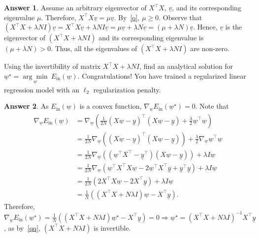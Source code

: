 \documentclass{article}
\theoremstyle{definition}
\newtheorem*{answer}{Answer}
\begin{document}
\begin{question}[start=0]
\begin{question}
			\begin{answer}
				Assume an arbitrary eigenvector of $X^\top X$, $\underline{v}$, and its corresponding eigenvalue $\mu$. Therefore, $X^\top X \underline{v} = \mu \underline{v}$. By~\ref{q}, $\mu \geq 0$. Observe that $(X^\top X + \lambda N  I) \underline{v} = X^\top X \underline{v} + \lambda N  I \underline{v} = \mu \underline{v} + \lambda N \underline{v} = (\mu + \lambda N) \underline{v}$. Hence, $\underline{v}$ is the eigenvector of $(X^\top X + \lambda N  I)$ and its corresponding eigenvalue is $(\mu + \lambda N) > 0$. Thus, all the eigenvalues of $(X^\top X + \lambda N  I)$ are non-zero.
			\end{answer}
			\item Using the invertibility of matrix $X^\top X + \lambda N  I$, find an analytical solution for $\underline{w}^\star = \underset{\underline{w}}{\arg \min}~E_{\text{in}}(\underline{w})$. Congratulations! You have trained a regularized linear regression model with an $\ell_2$ regularization penalty.
			\begin{answer}
				As $E_{\text{in}}(\underline{w})$ is a convex function, $\nabla_{\!\underline{w}}E_{\text{in}}(\underline{w}^\star) = 0$. Note that 
				\begin{align*}
					\nabla_{\!\underline{w}}E_{\text{in}}(\underline{w})  &= \nabla_{\!\underline{w}}(\frac{1}{2N} (X \underline{w} - \underline{y})^\top (X \underline{w} - \underline{y}) + \frac{\lambda}{2} \underline{w}^\top \underline{w})\\
					&= \frac{1}{2N} \nabla_{\!\underline{w}}\left((X \underline{w} - \underline{y})^\top (X \underline{w} - \underline{y})\right)+\frac{\lambda}{2} \nabla_{\!\underline{w}} \underline{w}^\top \underline{w}\\
					&= \frac{1}{2N} \nabla_{\!\underline{w}}\left((\underline{w}^\top X^\top  - \underline{y}^\top) (X \underline{w} - \underline{y})\right)+\lambda I \underline{w}\\
					&= \frac{1}{2N} \nabla_{\!\underline{w}}\left(\underline{w}^\top X^\top X \underline{w} - 2\underline{w}^\top X^\top \underline{y}  + \underline{y}^\top \underline{y}\right)+\lambda I \underline{w}\\
					&= \frac{1}{2N} \left(2 X^\top X \underline{w} - 2 X^\top \underline{y}\right)+\lambda I \underline{w}\\
					&= \frac{1}{N} \left((X^\top X + N \lambda I) \underline{w} - X^\top \underline{y}\right).
				\end{align*}
				Therefore, $\nabla_{\!\underline{w}}E_{\text{in}}(\underline{w}^\star) = \frac{1}{N} \left((X^\top X + N \lambda I) \underline{w}^\star - X^\top \underline{y}\right) = 0 \Rightarrow \underline{w}^\star = (X^\top X + N \lambda I)^{-1} X^\top \underline{y}$, as by~\ref{qq}, $(X^\top X + N \lambda I)$ is invertible.

\end{answer}
\end{question}
\end{question}
\end{document}

